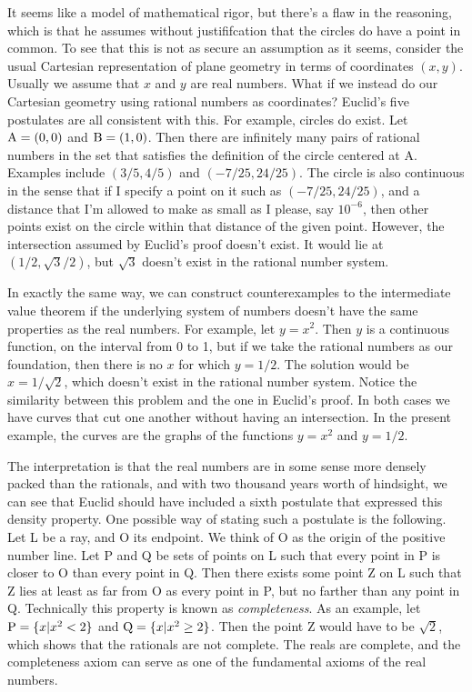 
It seems like a model of mathematical rigor, but there's a flaw in the reasoning, which is that he assumes
without justififcation that the circles do have a point in common. To see that this is not as secure an assumption as it seems, consider
the usual Cartesian representation of plane geometry in terms of coordinates $(x,y)$.
Usually we assume that $x$ and $y$ are real numbers. What if we instead do our Cartesian geometry
using rational numbers as coordinates? Euclid's five postulates are all consistent with this.
For example, circles do exist. Let $\textup{A}=(0,0)$ and $\textup{B}=(1,0)$. Then there are infinitely
many pairs of rational numbers in the set that satisfies the definition of the circle centered at A. Examples include $(3/5,4/5)$
and $(-7/25,24/25)$. The circle is also continuous in the sense that if I specify a point on it such
as $(-7/25,24/25)$, and a distance that I'm allowed to make as small as I please, say $10^{-6}$, then other
points exist on the circle within that distance of the given point. However, the intersection
assumed by Euclid's proof doesn't exist. It would lie at $(1/2,\sqrt{3}/2)$, but $\sqrt{3}$ doesn't
exist in the rational number system.

In exactly the same way, we can construct counterexamples to the intermediate value theorem if
the underlying system of numbers doesn't have the same properties as the real numbers. For example,
let $y=x^2$. Then $y$ is a continuous function, on the interval from 0 to 1, but if we take the rational
numbers as our foundation, then there is no $x$ for which $y=1/2$. The solution would be $x=1/\sqrt{2}$, which
doesn't exist in the rational number system. Notice the similarity between this problem and the one in
Euclid's proof. In both cases we have curves that cut one another without having an intersection.
In the present example, the curves are the graphs of the functions $y=x^2$ and $y=1/2$.

The interpretation is that the real numbers are in some sense more densely packed than the rationals,
and with two thousand years worth of hindsight, we can see that Euclid should have included a
sixth postulate that expressed this density property. One possible way of stating such a postulate
is the following. Let L be a ray, and O its endpoint. We think of O as the
origin of the positive number line.
Let P and Q be sets of points on L such that every point in P is closer to O than every point in Q.
Then there exists some point Z on L such that Z lies at least as far from O as every point in P,
but no farther than any point in Q. Technically this property is known as \emph{completeness}.
As an example, let $\textup{P}=\{x|x^2<2\}$ and $\textup{Q}=\{x|x^2 \ge 2\}$. Then the point Z would have to be $\sqrt{2}$,
which shows that the rationals are not complete. The reals are complete, and the completeness
axiom can serve as one of the fundamental axioms of the real numbers.

